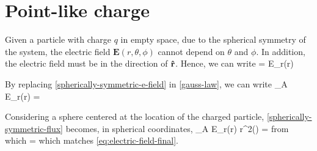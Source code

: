 \section{Point-like charge}
Given a particle with charge $q$ in empty space, due to the spherical symmetry of the system, the electric field $\mathbf{E}(r,\theta,\phi)$ 
cannot depend on $\theta$ and $\phi$. In addition, the electric field must be in the direction of $\boldsymbol{\hat{\textbf{$\mathrm r$}}}$. Hence, we can write
\be\label{spherically-symmetric-e-field}
 = E_r(r) \cdot {}
\ee

By replacing \ref{spherically-symmetric-e-field} in \ref{gauss-law}, we can write
\be\label{spherically-symmetric-flux}
\oiint_A E_r(r) \cdot {} \cdot {} =
\ee

Considering a sphere centered at the location of the charged particle, \ref{spherically-symmetric-flux} becomes, in spherical coordinates,
\be\label{spherically-symmetric-flux-2}
\oiint_A E_r(r) \cdot {} \cdot r^{2}\sin(\phi)\theta{}\phi{} =
\ee
from which
\be
{}=
\ee
which matches \ref{eq:electric-field-final}.
